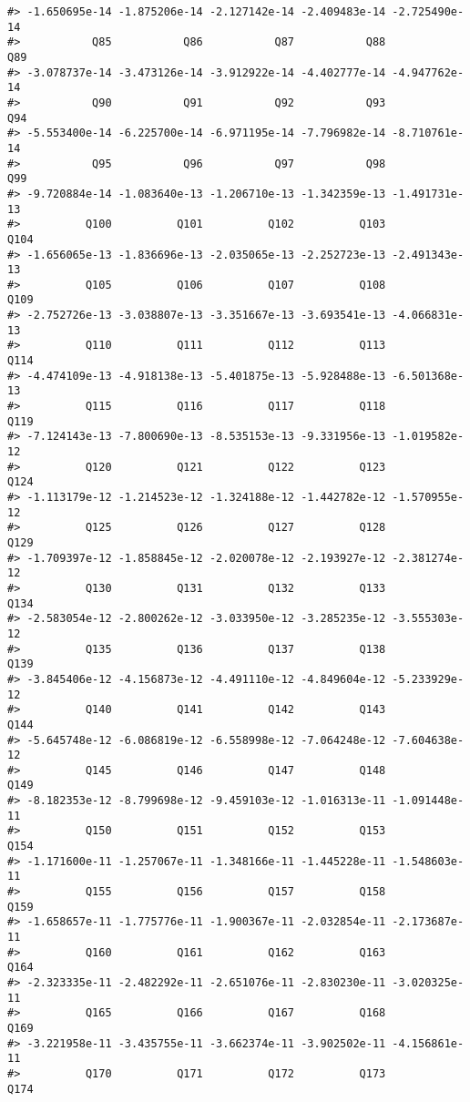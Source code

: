 \documentclass[]{article}
\begin{document}
\begin{verbatim}
#> -1.650695e-14 -1.875206e-14 -2.127142e-14 -2.409483e-14 -2.725490e-14 
#>           Q85           Q86           Q87           Q88           Q89 
#> -3.078737e-14 -3.473126e-14 -3.912922e-14 -4.402777e-14 -4.947762e-14 
#>           Q90           Q91           Q92           Q93           Q94 
#> -5.553400e-14 -6.225700e-14 -6.971195e-14 -7.796982e-14 -8.710761e-14 
#>           Q95           Q96           Q97           Q98           Q99 
#> -9.720884e-14 -1.083640e-13 -1.206710e-13 -1.342359e-13 -1.491731e-13 
#>          Q100          Q101          Q102          Q103          Q104 
#> -1.656065e-13 -1.836696e-13 -2.035065e-13 -2.252723e-13 -2.491343e-13 
#>          Q105          Q106          Q107          Q108          Q109 
#> -2.752726e-13 -3.038807e-13 -3.351667e-13 -3.693541e-13 -4.066831e-13 
#>          Q110          Q111          Q112          Q113          Q114 
#> -4.474109e-13 -4.918138e-13 -5.401875e-13 -5.928488e-13 -6.501368e-13 
#>          Q115          Q116          Q117          Q118          Q119 
#> -7.124143e-13 -7.800690e-13 -8.535153e-13 -9.331956e-13 -1.019582e-12 
#>          Q120          Q121          Q122          Q123          Q124 
#> -1.113179e-12 -1.214523e-12 -1.324188e-12 -1.442782e-12 -1.570955e-12 
#>          Q125          Q126          Q127          Q128          Q129 
#> -1.709397e-12 -1.858845e-12 -2.020078e-12 -2.193927e-12 -2.381274e-12 
#>          Q130          Q131          Q132          Q133          Q134 
#> -2.583054e-12 -2.800262e-12 -3.033950e-12 -3.285235e-12 -3.555303e-12 
#>          Q135          Q136          Q137          Q138          Q139 
#> -3.845406e-12 -4.156873e-12 -4.491110e-12 -4.849604e-12 -5.233929e-12 
#>          Q140          Q141          Q142          Q143          Q144 
#> -5.645748e-12 -6.086819e-12 -6.558998e-12 -7.064248e-12 -7.604638e-12 
#>          Q145          Q146          Q147          Q148          Q149 
#> -8.182353e-12 -8.799698e-12 -9.459103e-12 -1.016313e-11 -1.091448e-11 
#>          Q150          Q151          Q152          Q153          Q154 
#> -1.171600e-11 -1.257067e-11 -1.348166e-11 -1.445228e-11 -1.548603e-11 
#>          Q155          Q156          Q157          Q158          Q159 
#> -1.658657e-11 -1.775776e-11 -1.900367e-11 -2.032854e-11 -2.173687e-11 
#>          Q160          Q161          Q162          Q163          Q164 
#> -2.323335e-11 -2.482292e-11 -2.651076e-11 -2.830230e-11 -3.020325e-11 
#>          Q165          Q166          Q167          Q168          Q169 
#> -3.221958e-11 -3.435755e-11 -3.662374e-11 -3.902502e-11 -4.156861e-11 
#>          Q170          Q171          Q172          Q173          Q174 

\end{verbatim}
\end{document}

